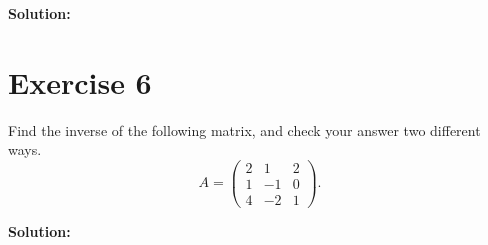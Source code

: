 \documentclass{article}
\begin{document}
\textbf{Solution: } \\



\newpage

\section*{Exercise 6}
Find the inverse of the following matrix, and check your answer two different ways.
$$A = \begin{pmatrix} 2 & 1 & 2 \\ 1 & -1 & 0 \\ 4 & -2 & 1 \end{pmatrix}.$$

\textbf{Solution: } \\
\end{document}
